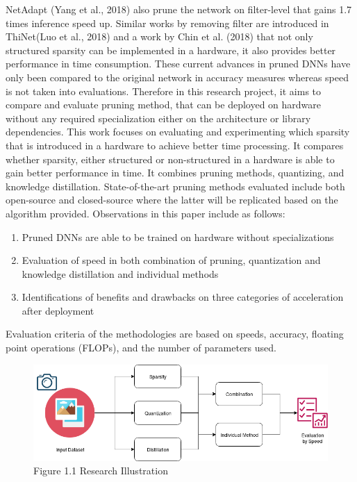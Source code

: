     NetAdapt (Yang et al., 2018) also prune the network on filter-level that gains 1.7 times inference speed up. Similar works by removing filter are introduced in ThiNet(Luo et al., 2018) and a work by Chin et al. (2018) that not only structured sparsity can be implemented in a hardware, it also provides better performance in time consumption. These current advances in pruned DNNs have only been compared to the original network in accuracy measures whereas speed is not taken into evaluations. Therefore in this research project, it aims to compare and evaluate pruning method, that can be deployed on hardware without any required specialization either on the architecture or library dependencies. This work focuses on evaluating and experimenting which sparsity that is introduced in a hardware to achieve better time processing. It compares whether sparsity, either structured or non-structured in a hardware is able to gain better performance in time. It combines pruning methods, quantizing, and knowledge distillation. State-of-the-art pruning methods evaluated include both open-source and closed-source where the latter will be replicated based on the algorithm provided. Observations in this paper include as follows:
    \begin{enumerate}
    	\item Pruned DNNs are able to be trained on hardware without specializations
    	\item Evaluation of speed in both combination of pruning, quantization and knowledge distillation and individual methods
    	\item Identifications of benefits and drawbacks on three categories of acceleration after deployment
    \end{enumerate}
    
    Evaluation criteria of the methodologies are based on speeds, accuracy, floating point operations (FLOPs), and the number of parameters used.
    
    \begin{figure}[h!]
\centering
\includegraphics[width=0.7\linewidth]{rnd_diagram}
\caption{Figure 1.1 Research Illustration}
\label{fig:rnd_diagram}
\end{figure}

